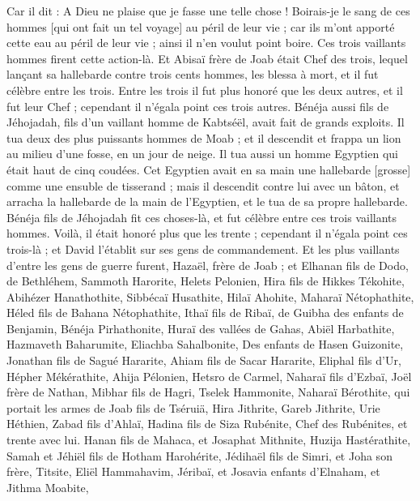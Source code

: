 \begin{multicols}{2}
Car il dit : A Dieu ne plaise que je fasse une telle chose ! Boirais-je le sang de ces hommes [qui ont fait un tel voyage] au péril de leur vie ; car ils m'ont apporté cette eau au péril de leur vie ; ainsi il n'en voulut point boire. Ces trois vaillants hommes firent cette action-là.
Et Abisaï frère de Joab était Chef des trois, lequel lançant sa hallebarde contre trois cents hommes, les blessa à mort, et il fut célèbre entre les trois.
Entre les trois il fut plus honoré que les deux autres, et il fut leur Chef ; cependant il n'égala point ces trois autres.
Bénéja aussi fils de Jéhojadah, fils d'un vaillant homme de Kabtséël, avait fait de grands exploits. Il tua deux des plus puissants hommes de Moab ; et il descendit et frappa un lion au milieu d'une fosse, en un jour de neige.
Il tua aussi un homme Egyptien qui était haut de cinq coudées. Cet Egyptien avait en sa main une hallebarde [grosse] comme une ensuble de tisserand ; mais il descendit contre lui avec un bâton, et arracha la hallebarde de la main de l'Egyptien, et le tua de sa propre hallebarde.
Bénéja fils de Jéhojadah fit ces choses-là, et fut célèbre entre ces trois vaillants hommes.
Voilà, il était honoré plus que les trente ; cependant il n'égala point ces trois-là ; et David l'établit sur ses gens de commandement.
Et les plus vaillants d'entre les gens de guerre furent, Hazaël, frère de Joab ; et Elhanan fils de Dodo, de Bethléhem,
Sammoth Harorite, Helets Pelonien,
Hira fils de Hikkes Tékohite, Abihézer Hanathothite,
Sibbécaï Husathite, Hilaï Ahohite,
Maharaï Nétophathite, Héled fils de Bahana Nétophathite,
Ithaï fils de Ribaï, de Guibha des enfants de Benjamin, Bénéja Pirhathonite,
Huraï des vallées de Gahas, Abiël Harbathite,
Hazmaveth Baharumite, Eliachba Sahalbonite,
Des enfants de Hasen Guizonite, Jonathan fils de Sagué Hararite,
Ahiam fils de Sacar Hararite, Eliphal fils d'Ur,
Hépher Mékérathite, Ahija Pélonien,
Hetsro de Carmel, Naharaï fils d'Ezbaï,
Joël frère de Nathan, Mibhar fils de Hagri,
Tselek Hammonite, Naharaï Bérothite, qui portait les armes de Joab fils de Tséruiä,
Hira Jithrite, Gareb Jithrite,
Urie Héthien, Zabad fils d'Ahlaï,
Hadina fils de Siza Rubénite, Chef des Rubénites, et trente avec lui.
Hanan fils de Mahaca, et Josaphat Mithnite,
Huzija Hastérathite, Samah et Jéhiël fils de Hotham Harohérite,
Jédihaël fils de Simri, et Joha son frère, Titsite,
Eliël Hammahavim, Jéribaï, et Josavia enfants d'Elnaham, et Jithma Moabite,

\end{multicols}
